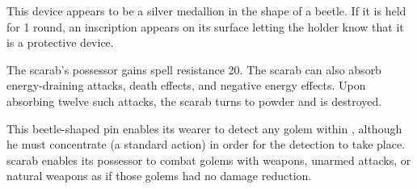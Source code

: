 \begin{comment}
d\% & Result \\
01?08 & Bag of 100 gold pieces \\
09?15 & Coffer, silver (6 in. by 6 in. by 1 ft.), 500 gp value \\
16?22 & Door, iron (up to 10 ft. wide and 10 ft. high and barred on one side - must be placed upright, attaches and hinges itself) \\
23?30 & Gems, 10 (100 gp value each) \\
31?44 & Ladder, wooden (24 ft. long) \\
45?51 & Mule (with saddle bags) \\
52?59 & Pit, open (10 ft. by 10 ft. by 10 ft.) \\
60?68 & Potion of cure serious wounds \\
69?75 & Rowboat (12 ft. long) \\
76?83 & Minor scroll of one randomly determined spell \\
84?90 & War dogs, pair (treat as riding dogs) \\
91?96 & Window (2 ft. by 4 ft., up to 2 ft. deep) \\
97?100 & Portable ram &

Multiple items of the same kind are permissible. Once removed, a patch cannot be replaced.

Moderate transmutation; CL 9th; Craft Wondrous Item, fabricate; Price 7,000 gp;Weight 1 lb.
\end{comment}

 This device appears to be a silver medallion in the shape of a beetle. If it is held for 1 round, an inscription appears on its surface letting the holder know that it is a protective device.

The scarab's possessor gains spell resistance 20. The scarab can also absorb energy-draining attacks, death effects, and negative energy effects. Upon absorbing twelve such attacks, the scarab turns to powder and is destroyed.

 This beetle-shaped pin enables its wearer to detect any golem within , although he must concentrate (a standard action) in order for the detection to take place.   scarab  enables its possessor to combat golems with weapons, unarmed attacks, or natural weapons as if those golems had no damage reduction.

